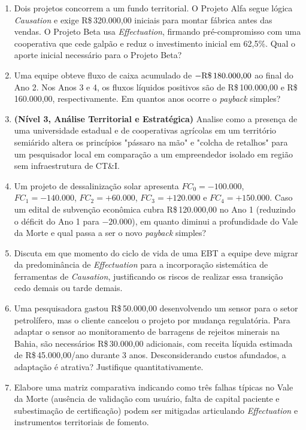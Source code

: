 \begin{enumerate}[leftmargin=1.5em, itemsep=6pt]
  \item Dois projetos concorrem a um fundo territorial. O Projeto Alfa segue lógica \textit{Causation} e exige R\$\,320.000,00 iniciais para montar fábrica antes das vendas. O Projeto Beta usa \textit{Effectuation}, firmando pré-compromisso com uma cooperativa que cede galpão e reduz o investimento inicial em 62{,}5\%. Qual o aporte inicial necessário para o Projeto Beta?
  \espacoResolucao[2.2cm]

  \item Uma equipe obteve fluxo de caixa acumulado de $-\text{R\$\,180.000,00}$ ao final do Ano 2. Nos Anos 3 e 4, os fluxos líquidos positivos são de R\$\,100.000,00 e R\$\,160.000,00, respectivamente. Em quantos anos ocorre o \textit{payback} simples?
  \espacoResolucao[2.2cm]

  \item \textbf{(Nível 3, Análise Territorial e Estratégica)} Analise como a presença de uma universidade estadual e de cooperativas agrícolas em um território semiárido altera os princípios "pássaro na mão" e "colcha de retalhos" para um pesquisador local em comparação a um empreendedor isolado em região sem infraestrutura de CT\&I.
  \espacoResolucao[2.2cm]

  \item Um projeto de dessalinização solar apresenta $FC_0 = -100.000$, $FC_1 = -140.000$, $FC_2 = +60.000$, $FC_3 = +120.000$ e $FC_4 = +150.000$. Caso um edital de subvenção econômica cubra R\$\,120.000,00 no Ano 1 (reduzindo o déficit do Ano 1 para $-20.000$), em quanto diminui a profundidade do Vale da Morte e qual passa a ser o novo \textit{payback} simples?
  \espacoResolucao[2.5cm]

  \item Discuta em que momento do ciclo de vida de uma EBT a equipe deve migrar da predominância de \textit{Effectuation} para a incorporação sistemática de ferramentas de \textit{Causation}, justificando os riscos de realizar essa transição cedo demais ou tarde demais.
  \espacoResolucao[2.2cm]

  \item Uma pesquisadora gastou R\$\,50.000,00 desenvolvendo um sensor para o setor petrolífero, mas o cliente cancelou o projeto por mudança regulatória. Para adaptar o sensor ao monitoramento de barragens de rejeitos minerais na Bahia, são necessários R\$\,30.000,00 adicionais, com receita líquida estimada de R\$\,45.000,00/ano durante 3 anos. Desconsiderando custos afundados, a adaptação é atrativa? Justifique quantitativamente.
  \espacoResolucao[2.4cm]

  \item Elabore uma matriz comparativa indicando como três falhas típicas no Vale da Morte (ausência de validação com usuário, falta de capital paciente e subestimação de certificação) podem ser mitigadas articulando \textit{Effectuation} e instrumentos territoriais de fomento.
  \espacoResolucao[2.4cm]
\end{enumerate}

